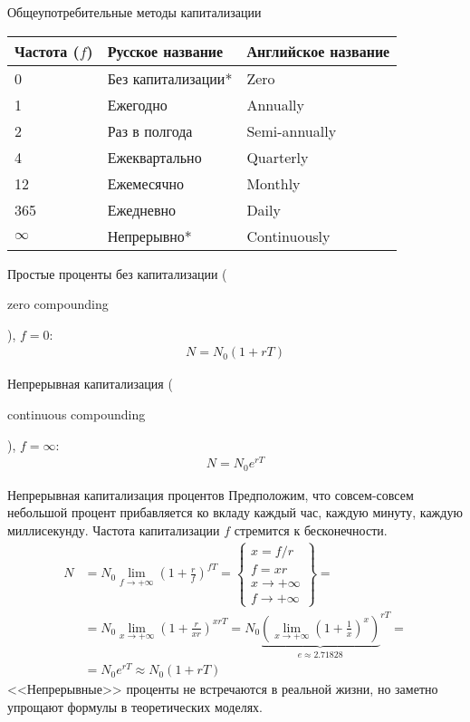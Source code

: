 \documentclass{beamer}
\newcommand{\en}[1]{\begin{otherlanguage}{english}#1\end{otherlanguage}}
\begin{document}
\begin{frame}{Общеупотребительные методы капитализации}
\centering
\begin{tabular}{l|l|l}
Частота ($f$) & Русское название & Английское название \\ \hline 
0 & Без капитализации* & Zero \\
1 & Ежегодно & Annually \\
2 & Раз в полгода & Semi-annually \\
4 & Ежеквартально & Quarterly \\
12 & Ежемесячно & Monthly \\
365 & Ежедневно & Daily \\
$\infty$ & Непрерывно* & Continuously 
\end{tabular}

\justify
Простые проценты без капитализации (\en{zero compounding}), $f=0$:
\begin{align*}
N = N_0 (1 + rT)
\end{align*}

Непрерывная капитализация (\en{continuous compounding}), $f=\infty$:
\begin{align*}
N = N_0e^{rT}
\end{align*}
\end{frame}



\begin{frame}{Непрерывная капитализация процентов}
\justify
Предположим, что совсем-совсем небольшой процент прибавляется ко вкладу каждый 
час, каждую минуту, каждую миллисекунду. Частота капитализации $f$ стремится к 
бесконечности.
\begin{align*}
N &= N_0 \lim_{f \to +\infty} \left(1 + \frac{r}{f}\right)^{fT} = 
\begin{Bmatrix}x= f/r \\ f=xr \\ x \to +\infty \\ f \to +\infty\end{Bmatrix} = \\
&= N_0\lim_{x \to +\infty} \left(1 + \frac{r}{xr}\right) ^ {xrT} =
N_0{\underbrace{\left(\lim_{x \to +\infty} \left( 1 + \frac{1}{x} \right) ^ x\right)}_{e \approx 2.71828}}  ^ {rT} = \\
&= N_0e^{rT} \approx N_0(1 + rT)
\end{align*}
<<Непрерывные>> проценты не встречаются в реальной жизни, но заметно упрощают 
формулы в теоретических моделях.
\end{frame}
\end{document}
